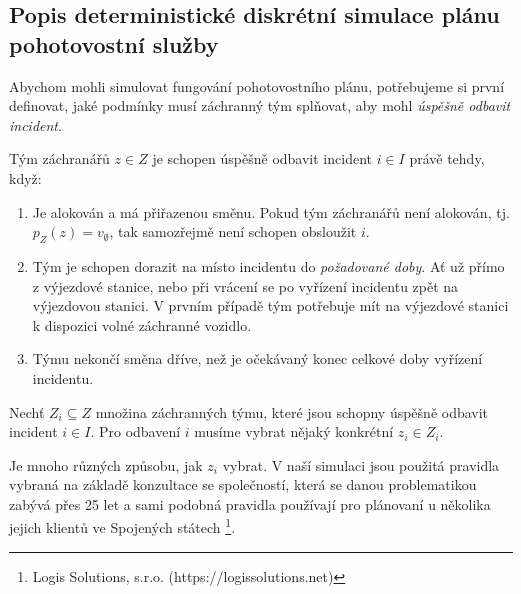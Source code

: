 \subsection{Popis deterministické diskrétní simulace plánu pohotovostní služby}\label{kap:definiceSimulace}

Abychom mohli simulovat fungování pohotovostního plánu,
potřebujeme si první definovat, jaké podmínky musí záchranný tým splňovat, aby mohl \textit{úspěšně odbavit incident}.

\begin{definice}\label{df:simulacePravidla1}
  Tým záchranářů $z \in Z$ je schopen úspěšně odbavit incident $i \in I$ právě tehdy, když:
  \begin{enumerate}
    \item
      Je alokován a má přiřazenou směnu. Pokud tým záchranářů není alokován, tj. $p_Z(z) = v_{\emptyset}$, tak samozřejmě není schopen obsloužit $i$.

    \item
      Tým je schopen dorazit na místo incidentu do \emph{požadované doby}.
      Ať už přímo z výjezdové stanice, nebo při vrácení se po vyřízení incidentu zpět na výjezdovou stanici. 
      V prvním případě tým potřebuje mít na výjezdové stanici k dispozici volné záchranné vozidlo.

    \item
      Týmu nekončí směna dříve, než je očekávaný konec celkové doby vyřízení incidentu.
  \end{enumerate}
\end{definice}

Nechť $Z_i \subseteq Z$ množina záchranných týmu, které jsou schopny úspěšně odbavit incident $i \in I$.
Pro odbavení $i$ musíme vybrat nějaký konkrétní $z_i \in Z_i$.

Je mnoho různých způsobu, jak $z_i$ vybrat.
V naší simulaci jsou použitá pravidla vybraná na základě konzultace se společností, která se danou problematikou zabývá přes 25 let
a sami podobná pravidla používají pro plánovaní u několika jejich klientů ve Spojených státech \footnote{Logis Solutions, s.r.o. (https://logissolutions.net)}.


